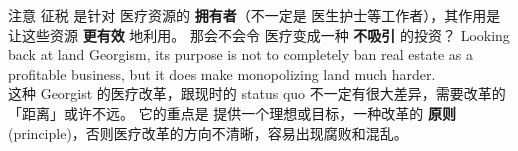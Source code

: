 \begin{preview}
\begin{minipage}{\textwidth}
注意 征税 是针对 医疗资源的 \textbf{拥有者}（不一定是 医生护士等工作者），其作用是 让这些资源 \textbf{更有效} 地利用。 那会不会令 医疗变成一种 \textbf{不吸引} 的投资？ Looking back at land Georgism, its purpose is not to completely ban real estate as a profitable business, but it does make monopolizing land much harder.\\

这种 Georgist 的医疗改革，跟现时的 status quo 不一定有很大差异，需要改革的「距离」或许不远。 它的重点是 提供一个理想或目标，一种改革的 \textbf{原则} (principle)，否则医疗改革的方向不清晰，容易出现腐败和混乱。

\end{minipage}
\end{preview}

